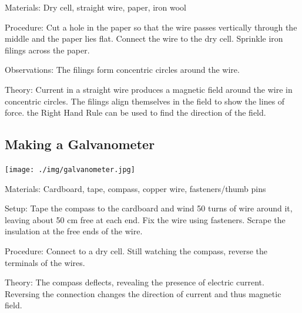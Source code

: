 \begin{multicols}{2}
\begin{description*}
\item[Materials:]{Dry cell, straight wire, paper, iron wool}
\item[Procedure:]{Cut a hole in the paper so that the wire passes vertically through the middle and the paper lies flat. Connect the wire to the dry cell. Sprinkle iron filings across the paper.}
\item[Observations:]{The filings form concentric circles around the wire.}
\item[Theory:]{Current in a straight wire produces a magnetic field around the wire in concentric circles. The filings align themselves in the field to show the lines of force. the Right Hand Rule can be used to find the direction of the field.}
\end{description*}

\subsection{Making a Galvanometer}

\begin{center}
\texttt{[image: ./img/galvanometer.jpg]}
\end{center}

\begin{description*}
\item[Materials:]{Cardboard, tape, compass, copper wire, fasteners/thumb pins}
\item[Setup:]{Tape the compass to the cardboard and wind 50 turns of wire around it, leaving about 50 cm free at each end. Fix the wire using fasteners. Scrape the insulation at the free ends of the wire.}
\item[Procedure:]{Connect to a dry cell. Still watching the compass, reverse the terminals of the wires.}
\item[Theory:]{The compass deflects, revealing the presence of electric current. Reversing the connection changes the direction of current and thus magnetic field.}
\end{description*}


\end{multicols}
